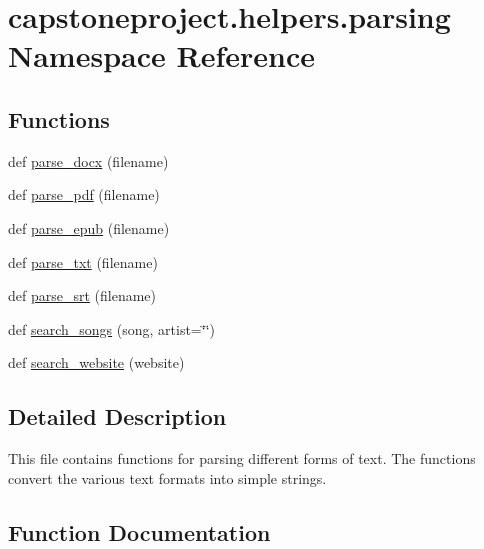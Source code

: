 \hypertarget{namespacecapstoneproject_1_1helpers_1_1parsing}{}\section{capstoneproject.\+helpers.\+parsing Namespace Reference}
\label{namespacecapstoneproject_1_1helpers_1_1parsing}
\subsection*{Functions}
\begin{DoxyCompactItemize}
\item 
def \mbox{\hyperlink{namespacecapstoneproject_1_1helpers_1_1parsing_a46495d837ce1ac5e6d70c12bca06ed64}{parse\+\_\+docx}} (filename)
\item 
def \mbox{\hyperlink{namespacecapstoneproject_1_1helpers_1_1parsing_aaedb4fff5ed35e366bded59afca0c56f}{parse\+\_\+pdf}} (filename)
\item 
def \mbox{\hyperlink{namespacecapstoneproject_1_1helpers_1_1parsing_a5f5865532be60ee335c3d045aeb06a47}{parse\+\_\+epub}} (filename)
\item 
def \mbox{\hyperlink{namespacecapstoneproject_1_1helpers_1_1parsing_aeb58d9fbf20a62927e3f22490f1dc760}{parse\+\_\+txt}} (filename)
\item 
def \mbox{\hyperlink{namespacecapstoneproject_1_1helpers_1_1parsing_affb8b513c7f687e47ca2c068cfa28d2d}{parse\+\_\+srt}} (filename)
\item 
def \mbox{\hyperlink{namespacecapstoneproject_1_1helpers_1_1parsing_ab61dc07445d1ead2bf985aa1ddcadc7c}{search\+\_\+songs}} (song, artist=\char`\"{}\char`\"{})
\item 
def \mbox{\hyperlink{namespacecapstoneproject_1_1helpers_1_1parsing_a6b677a3dfd33e29cc5e4049f9a174062}{search\+\_\+website}} (website)
\end{DoxyCompactItemize}


\subsection{Detailed Description}
\begin{DoxyVerb}This file contains functions for parsing different forms of text.
The functions convert the various text formats into simple strings.
\end{DoxyVerb}
 

\subsection{Function Documentation}
\mbox{\label{namespacecapstoneproject_1_1helpers_1_1parsing_a46495d837ce1ac5e6d70c12bca06ed64}} 
